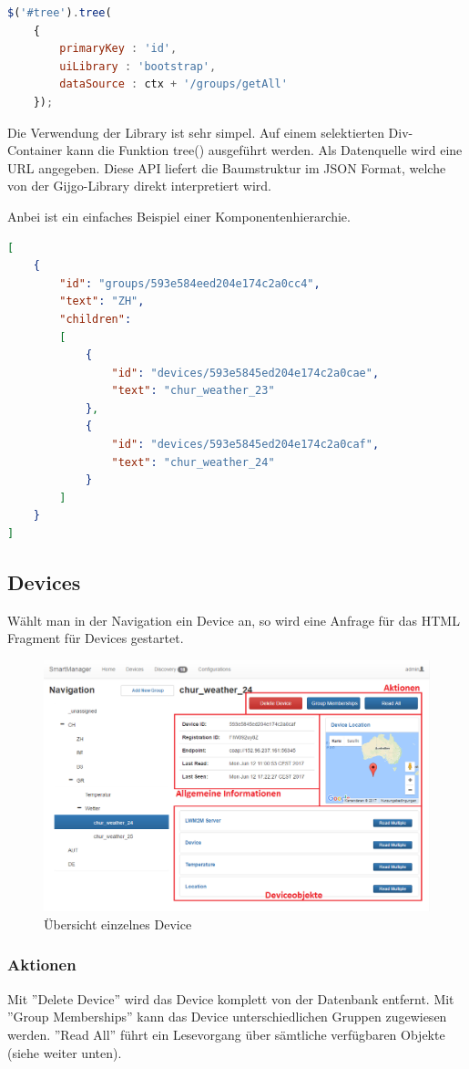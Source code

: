 \begin{lstlisting}[language=js]
$('#tree').tree(
	{
		primaryKey : 'id',
		uiLibrary : 'bootstrap',
		dataSource : ctx + '/groups/getAll'
	});
\end{lstlisting}

Die Verwendung der Library ist sehr simpel. Auf einem selektierten Div-Container kann die Funktion tree() ausgeführt werden. Als Datenquelle wird eine URL angegeben. Diese API liefert die Baumstruktur im JSON Format, welche von der Gijgo-Library direkt interpretiert wird.

Anbei ist ein einfaches Beispiel einer Komponentenhierarchie.

\begin{lstlisting}[language=json]
[
	{
		"id": "groups/593e584eed204e174c2a0cc4",
		"text": "ZH",
		"children": 
	  	[
		  	{
				"id": "devices/593e5845ed204e174c2a0cae",
				"text": "chur_weather_23"
			},
			{
				"id": "devices/593e5845ed204e174c2a0caf",
				"text": "chur_weather_24"
			}
		]
	}
]
\end{lstlisting}

\subsection{Devices}
Wählt man in der Navigation ein Device an, so wird eine Anfrage für das HTML Fragment für Devices gestartet. 

\begin{figure}[H]
\centering
\includegraphics[scale=0.57]{../04_Realisierung/images/userinterface/devicefragment_collapsed.png}
\caption{Übersicht einzelnes Device}
\end{figure}

\subsubsection{Aktionen}
Mit ''Delete Device'' wird das Device komplett von der Datenbank entfernt. Mit ''Group Memberships'' kann das Device unterschiedlichen Gruppen zugewiesen werden. ''Read All'' führt ein Lesevorgang über sämtliche verfügbaren Objekte (siehe weiter unten).

